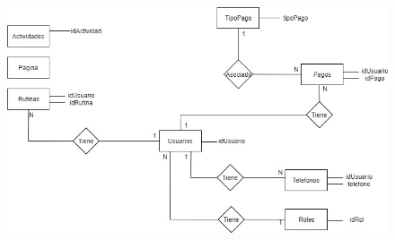 \documentclass[a4paper, 12pt, spanish]{report}
\begin{document}
\begin{figure}[H]
	\centering
	\includegraphics[width=\linewidth]{imagenes/mer}
	\label{fig:mer}
\end{figure}
\newpage
\end{document}
